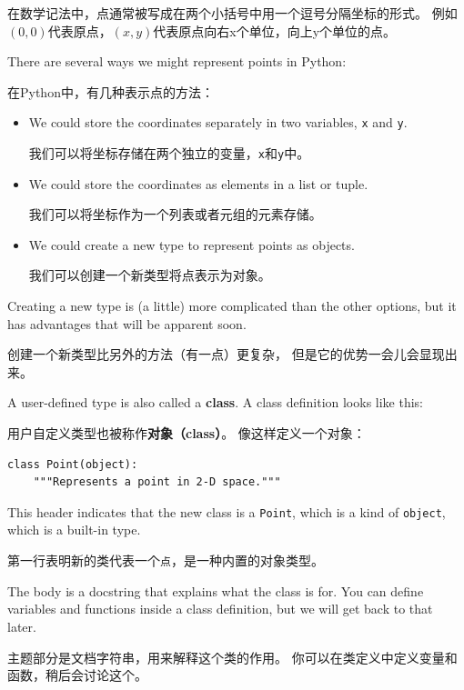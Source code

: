 \documentclass[10pt]{book}
\begin{document}
\begin{CJK}{UTF8}{gbsn}
在数学记法中，点通常被写成在两个小括号中用一个逗号分隔坐标的形式。
例如$(0,0)$代表原点，$(x,y)$代表原点向右x个单位，向上y个单位的点。

There are several ways we might represent points in Python:

在Python中，有几种表示点的方法：

\begin{itemize}

\item We could store the coordinates separately in two
variables, {\tt x} and {\tt y}.

我们可以将坐标存储在两个独立的变量，{\tt x}和{\tt y}中。

\item We could store the coordinates as elements in a list
or tuple.

我们可以将坐标作为一个列表或者元组的元素存储。

\item We could create a new type to represent points as
objects.

我们可以创建一个新类型将点表示为对象。

\end{itemize}

Creating a new type
is (a little) more complicated than the other options, but
it has advantages that will be apparent soon.

创建一个新类型比另外的方法（有一点）更复杂，
但是它的优势一会儿会显现出来。

A user-defined type is also called a {\bf class}.
A class definition looks like this:

用户自定义类型也被称作{\bf 对象（class）}。
像这样定义一个对象：

\begin{verbatim}
class Point(object):
    """Represents a point in 2-D space."""
\end{verbatim}
%
This header indicates that the new class is a {\tt Point},
which is a kind of {\tt object}, which is a built-in
type.

第一行表明新的类代表一个{\tt 点}，是一种内置的对象类型。

The body is a docstring that explains what the class is for.
You can define variables and functions inside a class definition,
but we will get back to that later.

主题部分是文档字符串，用来解释这个类的作用。
你可以在类定义中定义变量和函数，稍后会讨论这个。


\end{CJK}
\end{document}
